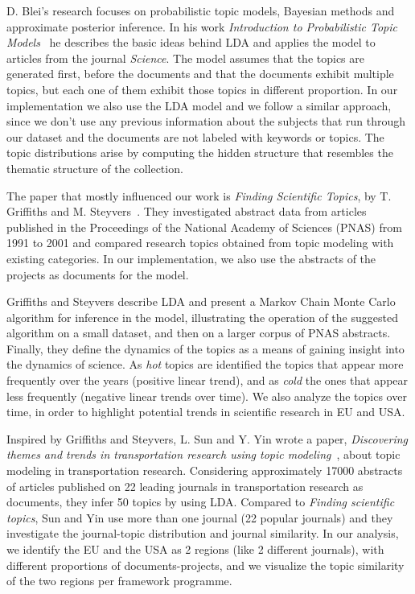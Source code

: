 \documentclass[12pt]{report}
\begin{document}
D. Blei's research focuses on probabilistic topic models, Bayesian methods and
approximate posterior inference. In his work \emph{Introduction to
Probabilistic Topic Models}~\cite{Blei11introductionto} 
he describes the basic ideas behind LDA and
applies the model to articles from the journal \emph{Science}. 
The model assumes that the topics are generated
first, before the documents and that the documents exhibit multiple
topics, but each one of them exhibit those topics in different
proportion. In our implementation we also use the LDA model and we
follow a similar approach, since we don't use any previous information
about the subjects that run through our dataset and the documents are
not labeled with keywords or topics. The topic distributions arise by
computing the hidden structure that resembles the thematic structure
of the collection.

The paper that mostly influenced our work is \emph{Finding Scientific Topics}, by
T. Griffiths and M. Steyvers~\cite{griffiths_steyvers04}. They investigated
abstract data from articles published in the Proceedings of the National Academy
of Sciences (PNAS) from 1991 to 2001 and compared research topics obtained from
topic modeling with existing categories. In our implementation, we also use 
the abstracts of the projects as documents for the model.

Griffiths and Steyvers describe LDA and present a Markov Chain Monte Carlo
algorithm for inference in the model, illustrating the operation of the
suggested algorithm on a small dataset, and then on a larger corpus of PNAS
abstracts. Finally, they define the dynamics of the topics as a means of gaining
insight into the dynamics of science. As \emph{hot} topics are identified the topics
that appear more frequently over the years (positive linear trend), and as
\emph{cold} the ones that appear less frequently (negative linear trends over time).
We also analyze the topics over time, in order to highlight potential trends in
scientific research in EU and USA.

Inspired by Griffiths and Steyvers, L. Sun and Y. Yin wrote a paper,
\emph{Discovering themes and trends in transportation research using topic
modeling}~\cite{Sun201749}, about topic modeling in transportation
research. Considering approximately 17000 abstracts of articles
published on 22 leading journals in transportation research as
documents, they infer 50 topics by using LDA. Compared to \emph{Finding
scientific topics}, Sun and Yin use more than one journal (22 popular
journals) and they investigate the journal-topic distribution and
journal similarity. In our analysis, we identify the EU and the USA as
2 regions (like 2 different journals), with different proportions of
documents-projects, and we visualize the topic similarity of the two
regions per framework programme.
\end{document}

